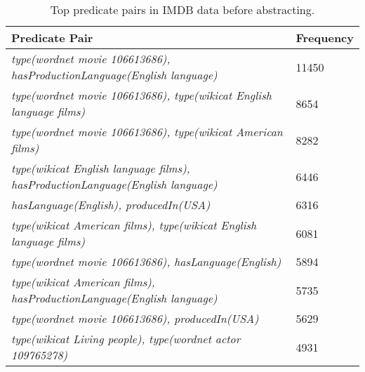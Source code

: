 \documentclass{acm_proc_article-sp}
\begin{document}
\begin{table}
\caption{Top predicate pairs in IMDB data before abstracting.}
\label{table3}
\begin{center}
\begin{tabular}{ |p{6cm}|p{1.5cm}| } 
\hline
Predicate Pair & Frequency\\
\hline
\textit{type(wordnet movie 106613686), hasProductionLanguage(English language)} & 11450 \\
\hline
\textit{type(wordnet movie 106613686), type(wikicat English language films)} & 8654 \\
\hline
\textit{type(wordnet movie 106613686), type(wikicat American films)} & 8282 \\
\hline
\textit{type(wikicat English language films), hasProductionLanguage(English language)} & 6446 \\
\hline
\textit{hasLanguage(English), producedIn(USA)} & 6316 \\
\hline
\textit{type(wikicat American films), type(wikicat English language films)} & 6081 \\
\hline
\textit{type(wordnet movie 106613686), hasLanguage(English)} & 5894 \\
\hline
\textit{type(wikicat American films), hasProductionLanguage(English language)} & 5735 \\
\hline
\textit{type(wordnet movie 106613686), producedIn(USA)} & 5629 \\
\hline
\textit{type(wikicat Living people), type(wordnet actor 109765278)} & 4931 \\
\hline
\end{tabular}
\end{center}
\end{table}
\end{document}

